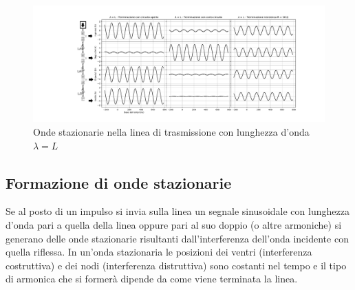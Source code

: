 \documentclass[journal]{IEEEtran}
\begin{document}
\begin{figure}[h]%
\includegraphics[trim = {200pt 0 0 0}, clip, width=1.1\textwidth]{analysis/output/Delay_line_lambdaL.pdf}
\caption{Onde stazionarie nella linea di trasmissione con lunghezza d'onda $\lambda = L$}
\label{fig: delayline L}
\end{figure}


\subsection{\textbf{Formazione di onde stazionarie}}

Se al posto di un impulso si invia sulla linea un segnale sinusoidale con lunghezza d'onda pari a quella della linea oppure pari al suo doppio (o altre armoniche) si generano delle onde stazionarie risultanti dall'interferenza dell'onda incidente con quella riflessa. 
In un'onda stazionaria le posizioni dei ventri (interferenza costruttiva) e dei nodi (interferenza distruttiva) sono costanti nel tempo e il tipo di armonica che si formerà dipende da come viene terminata la linea.
\end{document}
